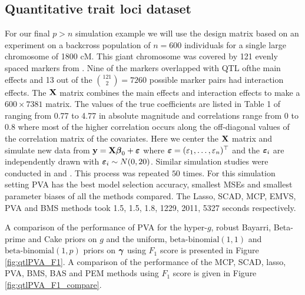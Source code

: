\subsection{Quantitative trait loci dataset}
\label{sec:QTL}

    For our final $p>n$ simulation example we will use the design matrix based
    on an experiment on a backcross population of $n=600$ individuals for a
    single large chromosome of 1800 cM. This giant chromosome was covered by
    121 evenly spaced markers from \cite{Xu2007}. Nine of the markers
    overlapped with QTL ofthe main effects and 13 out of the ${121 \choose 2} =
    7260$ possible marker pairs had interaction effects. The ${\bf X}$ matrix
    combines the main effects and interaction effects to make a $600\times
    7381$ matrix. The values of the true coefficients are listed in Table 1 of
    \cite{Xu2007} ranging from 0.77 to 4.77 in absolute magnitude and
    correlations range from 0 to 0.8 where most of the higher correlation
    occurs along the off-diagonal values of the correlation matrix of the
    covariates. Here we center the ${\bf X}$ matrix and simulate new data from ${\bf y}
    = {\bf X}{\boldsymbol \beta}_0 + {\boldsymbol \varepsilon}$ where ${\boldsymbol \varepsilon} =
    (\varepsilon_1,\ldots,\varepsilon_n)^\top$ and the ${\boldsymbol \varepsilon}_i$ are
    independently drawn with ${\boldsymbol \varepsilon}_i \sim N(0,20)$. Similar simulation
    studies were conducted in \cite{Xu2007} and \cite{Karkkainen2012}. This
    process was repeated $50$ times.  For this simulation setting PVA has the
    best model selection accuracy, smallest MSEs and smallest parameter biases
    of all the methods compared.  The Lasso, SCAD, MCP, EMVS, PVA and BMS
    methods took 1.5, 1.5, 1.8, 1229, 2011, 5327 seconds respectively.

A comparison of the performance of PVA for the hyper-$g$, robust Bayarri,
Beta-prime and Cake priors on $g$ and the uniform, $\text{beta-binomial}(1, 1)$
and \\ $\text{beta-binomial}(1, p)$ priors on ${\boldsymbol \gamma}$ using $F_1$ score is
presented in Figure \ref{fig:qtlPVA_F1}. A comparison of the performance of the
MCP, SCAD, lasso, PVA, BMS, BAS and PEM  methods using $F_1$ score is given in
Figure \ref{fig:qtlPVA_F1_compare}.

